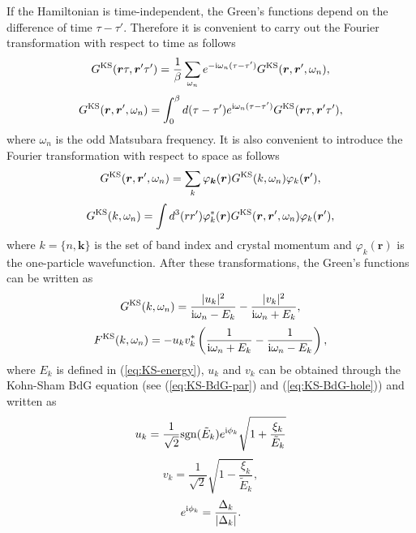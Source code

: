If the Hamiltonian is time-independent, the
Green's functions depend on the difference of time $\tau - \tau'$. Therefore it is convenient
to carry out the Fourier transformation with respect to time as follows
%
\begin{equation}
	G^{\rm KS}(\bm r \tau, \bm r' \tau') = \frac{1}{\beta} \sum_{\omega_n}
	e^{-{\rm i}\omega_n(\tau-\tau')} G^{\rm KS}(\bm r,\bm r', \omega_n),
	\label{eq:GFourier1}
\end{equation}
%
\begin{equation}
	G^{\rm KS}(\bm r, \bm r', \omega_n) = \int_{0}^{\beta} d(\tau-\tau')
	e^{{\rm i}\omega_n(\tau-\tau')} G^{\rm KS}(\bm r \tau,\bm r' \tau'),
	\label{eq:GFourier2}
\end{equation}
%
where $\omega_n$ is the odd Matsubara frequency. It is also convenient to introduce the Fourier
transformation with respect to space as follows
%
\begin{equation}
	G^{\rm KS}(\bm r, \bm r', \omega_n) = \sum_{ k}\varphi_{\bm k}(\bm r)
	G^{\rm KS}( k, \omega_n)\varphi_{ k}(\bm r'),
\label{eq:GFourier3}
\end{equation}
%
\begin{equation}
	G^{\rm KS}( k, \omega_n) = \int d^3(rr') \varphi^{\ast}_{ k}(\bm r)
	G^{\rm KS}(\bm r,\bm r', \omega_n)
	\varphi_{ k}(\bm r'),
	\label{eq:GFourier4}
\end{equation}
%
where $k=\{ n, \bm k \}$ is the set of band index and crystal momentum and 
$\varphi_{ k}(\bm r)$ is the one-particle wavefunction. After these transformations,
the Green's functions can be written as
%
\begin{equation}
	G^{\rm KS}( k, \omega_n) = \frac{|u_{ k}|^2}{ {\rm i}\omega_n - E_{ k}}
	- \frac{|v_{ k}|^2}{ {\rm i}\omega_n + E_{ k}},
	\label{eq:Gkomega}
\end{equation}
%
\begin{equation}
	F^{\rm KS}( k, \omega_n) = - u_{ k}v_{ k}^{\ast} \left( 
	\frac{1}{ {\rm i}\omega_n + E_{ k}} -\frac{1}{ {\rm i}\omega_n - E_{ k}}
	\right),
	\label{eq:Fkomega}
\end{equation}
%
where $E_{ k} $ is defined in (\ref{eq:KS-energy}), $u_{ k}$ and $v_{ k}$ can be obtained
through the Kohn-Sham BdG equation (see (\ref{eq:KS-BdG-par}) and (\ref{eq:KS-BdG-hole})) 
and written as
%
\begin{equation}
	u_{ k} = \frac{1}{\sqrt{2}} {\rm sgn}(\tilde{E}_{ k})e^{ {\rm i}\phi_{ k}}
	\sqrt{1 + \frac{\xi_{ k}}{\tilde{E}_{ k}}}
	\label{eq:uk}
\end{equation}
%
\begin{equation}
	v_{ k} = \frac{1}{\sqrt{2}} \sqrt{1 - \frac{\xi_{ k}}{\tilde{E}_{ k}}},
	\label{eq:vk}
\end{equation}
%
\begin{equation}
	e^{ {\rm i}\phi_{ k}} = \frac{\Delta_{ k}}{|\Delta_{ k}|}.
	\label{eq:phase}
\end{equation}
%

